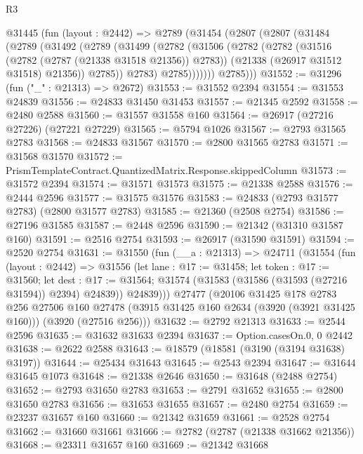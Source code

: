 \begin{lexlean}{R3}
\begin{coremodule}
    @31445
      (fun (layout : @2442) =>
      @2789
        (@31454
          (@2807
            (@2807
              (@31484
                (@2789
                  (@31492
                    (@2789
                      (@31499
                        (@2782
                          (@31506
                            (@2782
                              (@2782
                                (@31516 (@2782 (@2787 (@21338 @31518 @21356)) @2783))
                                (@21338 (@26917 @31512 @31518) @21356))
                              @2785))
                          @2783)
                        @2785)))))))
          @2785)))
@31552 := @31296 (fun ("_" : @21313) => @2672)
@31553 := @31552 @2394
@31554 := @31553 @24839
@31556 := @24833 @31450 @31453
@31557 := @21345 @2592
@31558 := @2480 @2588
@31560 := @31557 @31558 @160
@31564 := @26917 (@27216 @27226) (@27221 @27229)
@31565 := @5794 @1026
@31567 := @2793 @31565 @2783
@31568 := @24833 @31567
@31570 := @2800 @31565 @2783
@31571 := @31568 @31570
@31572 := PrismTemplateContract.QuantizedMatrix.Response.skippedColumn
@31573 := @31572 @2394
@31574 := @31571 @31573
@31575 := @21338 @2588
@31576 := @2444 @2596
@31577 := @31575 @31576
@31583 := @24833 (@2793 @31577 @2783) (@2800 @31577 @2783)
@31585 := @21360 (@2508 @2754)
@31586 := @27196 @31585
@31587 := @2448 @2596
@31590 := @21342 (@31310 @31587 @160)
@31591 := @2516 @2754
@31593 := @26917 (@31590 @31591)
@31594 := @2520 @2754
@31631 := @31550
    (fun (__a : @21313) =>
    @24711
      (@31554
        (fun (layout : @2442) =>
        @31556
          (let lane : @17 := @31458;
          let token : @17 := @31560;
          let dest : @17 := @31564; @31574 (@31583 (@31586 (@31593 (@27216 @31594)) @2394) @24839))
          @24839)))
    @27477
    (@20106
      @31425
      @178
      @2783
      @256
      @27506
      @160
      @27478
      (@3915 @31425 @160 @2634 (@3920 (@3921 @31425 @160)))
      (@3920 (@27516 @256)))
@31632 := @2792 @21313
@31633 := @2544 @2596
@31635 := @31632 @31633 @2394
@31637 := Option.casesOn.{0, 0} @2442
@31638 := @2622 @2588
@31643 := @18579 (@18581 (@3190 (@3194 @31638) @3197))
@31644 := @25434 @31643
@31645 := @2543 @2394
@31647 := @31644 @31645 @1073
@31648 := @21338 @2646
@31650 := @31648 (@2488 @2754)
@31652 := @2793 @31650 @2783
@31653 := @2791 @31652
@31655 := @2800 @31650 @2783
@31656 := @31653 @31655
@31657 := @2480 @2754
@31659 := @23237 @31657 @160
@31660 := @21342 @31659
@31661 := @2528 @2754
@31662 := @31660 @31661
@31666 := @2782 (@2787 (@21338 @31662 @21356))
@31668 := @23311 @31657 @160
@31669 := @21342 @31668

\end{coremodule}
\end{lexlean}
